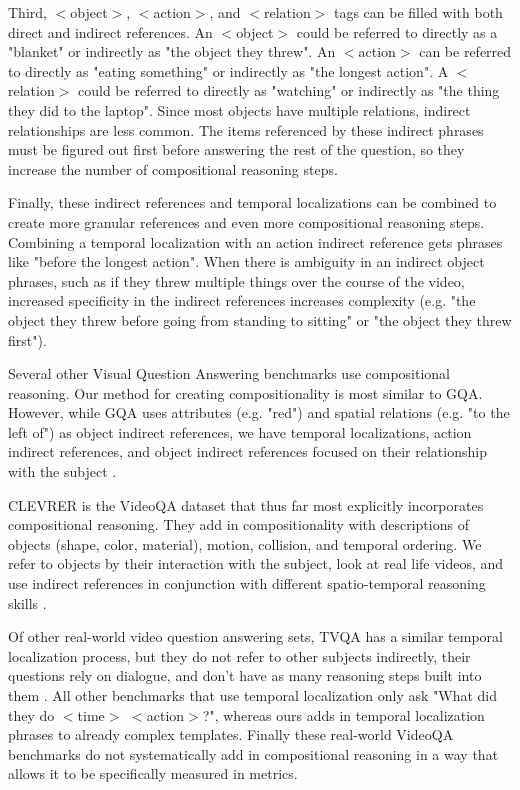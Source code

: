 Third, $<$object$>$, $<$action$>$, and $<$relation$>$ tags can be filled with both direct and indirect references. An $<$object$>$ could be referred to directly as a "blanket" or indirectly as "the object they threw". An $<$action$>$ can be referred to directly as "eating something" or indirectly as "the longest action". A $<$relation$>$ could be referred to directly as "watching" or indirectly as "the thing they did to the laptop". Since most objects have multiple relations, indirect relationships are less common. The items referenced by these indirect phrases must be figured out first before answering the rest of the question, so they increase the number of compositional reasoning steps.

Finally, these indirect references and temporal localizations can be combined to create more granular references and even more compositional reasoning steps. Combining a temporal localization with an action indirect reference gets phrases like "before the longest action". When there is ambiguity in an indirect object phrases, such as if they threw multiple things over the course of the video, increased specificity in the indirect references increases complexity (e.g. "the object they threw before going from standing to sitting" or "the object they threw first").

Several other Visual Question Answering benchmarks use compositional reasoning. Our method for creating compositionality is most similar to GQA. However, while GQA uses attributes (e.g. "red") and spatial relations (e.g. "to the left of") as object indirect references, we have temporal localizations, action indirect references, and object indirect references focused on their relationship with the subject \cite{hudson2019gqa}. 

CLEVRER is the VideoQA dataset that thus far most explicitly incorporates compositional reasoning. They add in compositionality with descriptions of objects (shape, color, material), motion, collision, and temporal ordering. We refer to objects by their interaction with the subject, look at real life videos, and use indirect references in conjunction with different spatio-temporal reasoning skills \cite{yi2019clevrer}.

Of other real-world video question answering sets, TVQA has a similar temporal localization process, but they do not refer to other subjects indirectly, their questions rely on dialogue, and don't have as many reasoning steps built into them \cite{lei2018tvqa}. All other benchmarks that use temporal localization only ask "What did they do $<$time$>$ $<$action$>$?", whereas ours adds in temporal localization phrases to already complex templates. Finally these real-world VideoQA benchmarks do not systematically add in compositional reasoning in a way that allows it to be specifically measured in metrics. 



